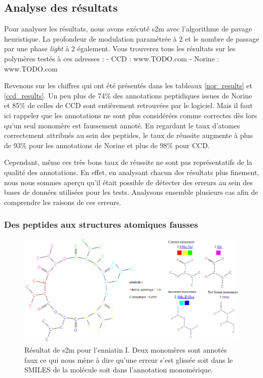 \subsection{Analyse des résultats}
\label{res_analyse}

Pour analyser les résultats, nous avons exécuté s2m avec l'algorithme de pavage heuristique.
La profondeur de modulation paramétrée à 2 et le nombre de passage par une phase \textit{light} à 2 également.
Vous trouverez tous les résultats sur les polymères testés à ces adresses :
- CCD : www.TODO.com
- Norine : www.TODO.com


Revenons sur les chiffres qui ont été présentés dans les tableaux \ref{nor_results} et \ref{ccd_results}.
Un peu plus de 74\% des annotations peptidiques issues de Norine et 85\% de celles de CCD sont entièrement retrouvées par le logiciel.
Mais il faut ici rappeler que les annotations ne sont plus considérées comme correctes dès lors qu'un seul monomère est faussement annoté.
En regardant le taux d'atomes correctement attribués au sein des peptides, le taux de réussite augmente à plus de 93\% pour les annotations de Norine et plus de 98\% pour CCD.

Cependant, même ces très bons taux de réussite ne sont pas représentatifs de la qualité des annotations.
En effet, en analysant chacun des résultats plus finement, nous nous sommes aperçu qu'il était possible de détecter des erreurs au sein des bases de données utilisées pour les tests.
Analysons ensemble plusieurs cas afin de comprendre les raisons de ces erreurs.


\subsubsection{Des peptides aux structures atomiques fausses}

\begin{figure}[!ht]
  \begin{center}
    \includegraphics[width=450px]{Figures/s2m/results/s2m_enniati.png}
    \caption{\label{s2m_enniati}Résultat de s2m pour l'enniatin I.
    Deux monomères sont annotés faux ce qui nous mène à dire qu'une erreur s'est glissée soit dans le SMILES de la molécule soit dans l'annotation monomérique.}
  \end{center}
\end{figure}


